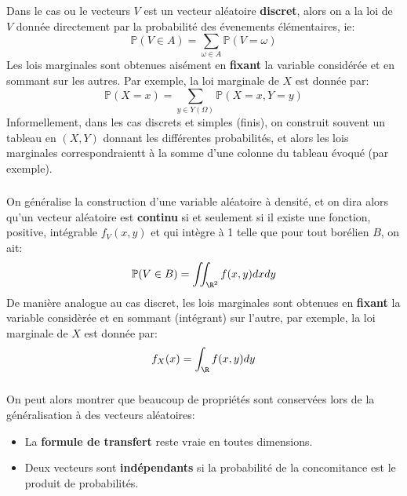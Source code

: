 \subsection*{}
Dans le cas ou le vecteurs \(V\) est un vecteur aléatoire \textbf{discret}, alors on a la loi de \(V\) donnée directement par la probabilité des évenements élémentaires, ie:
\[
   \mathbb{P}(V \in A) = \sum_{\omega \in A} \mathbb{P}(V = \omega)
\]
Les lois marginales sont obtenues aisément en \textbf{fixant} la variable considérée et en sommant sur les autres. Par exemple, la loi marginale de \(X\) est donnée par:
\[
   \mathbb{P}(X = x) = \sum_{y \in Y(\Omega)} \mathbb{P}(X = x, Y = y)
\]
Informellement, dans les cas discrets et simples (finis), on construit souvent un tableau en \((X, Y)\) donnant les différentes probabilités, et alors les lois marginales correspondraientt à la somme d'une colonne du tableau évoqué (par exemple).

\subsection*{}
On généralise la construction d'une variable aléatoire à densité, et on dira alors qu'un vecteur aléatoire est \textbf{continu} si et seulement si il existe une fonction, positive, intégrable \(f_V(x, y)\) et qui intègre à 1 telle que pour tout borélien \(B\), on ait:
\[
   \mathbb{P}(V \in B) = \iint_{\R^2} f(x,y)  d x d y
\]
De manière analogue au cas discret, les lois marginales sont obtenues en \textbf{fixant} la variable considèrée et en sommant (intégrant) sur l'autre, par exemple, la loi marginale de \(X\) est donnée par:
\[
   f_X(x) = \int_{\R} f(x,y) d y
\]

\subsection*{}
On peut alors montrer que beaucoup de propriétés sont conservées lors de la généralisation à des vecteurs aléatoires:
\begin{itemize}
   \item La \textbf{formule de transfert} reste vraie en toutes dimensions.
   \item Deux vecteurs sont \textbf{indépendants} si la probabilité de la concomitance est le produit de probabilités.
\end{itemize}
\chapter*{} %

